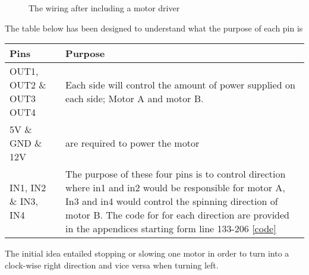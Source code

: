 \documentclass[11pt]{article}
\begin{document}
\begin{center}
	\begin{figure}[H]
		\centering
		\qquad
		\caption{The wiring after including a motor driver }
		\label{fig:Starting}
	\end{figure}
	
\end{center}
The table below has been designed to understand what the purpose of each pin is 
	\begin{center}
	\setlength{\tabcolsep}{10pt} %
	\renewcommand{\arraystretch}{1.5} %
	\begin{tabular}{ | m{3cm} |m{11cm} |  } 
		
		\hline
		Pins & Purpose   
		\\ 
		
		\hline
		
		OUT1, OUT2 \& OUT3 OUT4 & Each side will control the amount of  power supplied on each side; Motor A and motor B.  \\ 
		
		\hline
		5V \& GND \& 12V 
		& are required to power the motor 
		\\ 
		\hline
		
		
		IN1, IN2 \& IN3, IN4 
		
		& The purpose of these four pins is to control direction where in1 and in2 would be responsible for motor A, In3 and in4 would control the spinning direction of motor B. The code for for each direction are provided in the appendices starting form line 133-206 \ref{code}
		
		\\ 
		\hline
		
	
		
	\end{tabular}
\end{center}



	
The initial idea entailed stopping or slowing one motor in order to turn into a clock-wise right direction and vice versa when turning left. 
\end{document}
